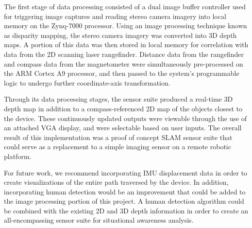 \par
The first stage of data processing consisted of a dual image buffer controller used for triggering image captures and reading stereo camera imagery into local memory on the Zynq-7000 processor. Using an image processing technique known as disparity mapping, the stereo camera imagery was converted into 3D depth maps. A portion of this data was then stored in local memory for correlation with data from the 2D scanning laser rangefinder. Distance data from the rangefinder and compass data from the magnetometer were simultaneously pre-processed on the ARM Cortex A9 processor, and then passed to the system's programmable logic to undergo further coordinate-axis transformation. 
\par
Through its data processing stages, the sensor suite produced a real-time 3D depth map in addition to a compass-referenced 2D map of the objects closest to the device. These continuously updated outputs were viewable through the use of an attached VGA display, and were selectable based on user inputs. The overall result of this implementation was a proof of concept SLAM sensor suite that could serve as a replacement to a simple imaging sensor on a remote robotic platform.
\par
For future work, we recommend incorporating IMU displacement data in order to create visualizations of the entire path traversed by the device. In addition, incorporating human detection would be an improvement that could be added to the image processing portion of this project. A human detection algorithm could be combined with the existing 2D and 3D depth information in order to create an all-encompassing sensor suite for situational awareness analysis. 





